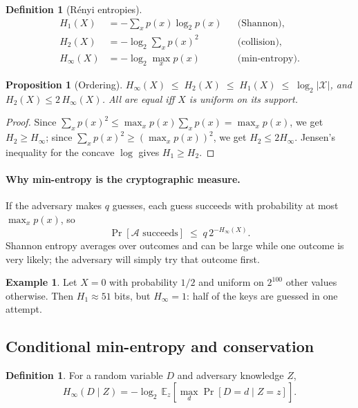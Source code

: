 \documentclass[11pt,a4paper]{article}
\theoremstyle{plain}
\newtheorem{proposition}[theorem]{Proposition}
\theoremstyle{definition}
\newtheorem{definition}[theorem]{Definition}
\newtheorem{example}[theorem]{Example}
\newcommand{\Hmin}{H_\infty}
\begin{document}
\begin{definition}[R\'enyi entropies]
\begin{align}
    H_1(X) &= -\sum_x p(x)\log_2 p(x) &&\text{(Shannon)},\label{eq:shannon}\\
    H_2(X) &= -\log_2 \sum_x p(x)^2 &&\text{(collision)},\label{eq:collision}\\
    \Hmin(X) &= -\log_2 \max_x p(x) &&\text{(min-entropy)}.\label{eq:minentropy}
\end{align}
\end{definition}

\begin{proposition}[Ordering]\label{prop:order}
$\Hmin(X)\;\le\;H_2(X)\;\le\;H_1(X)\;\le\;\log_2|\mathcal{X}|$, and
$H_2(X)\le 2\,\Hmin(X)$. All are equal iff $X$ is uniform on its support.
\end{proposition}

\begin{proof}
Since $\sum_x p(x)^2 \le \max_x p(x)\sum_x p(x)=\max_x p(x)$, we get
$H_2\ge\Hmin$; since $\sum_x p(x)^2\ge(\max_x p(x))^2$, we get $H_2\le 2\Hmin$.
Jensen's inequality for the concave $\log$ gives $H_1\ge H_2$.
\end{proof}

\paragraph{Why min-entropy is the cryptographic measure.} If the adversary makes
$q$ guesses, each guess succeeds with probability at most $\max_x p(x)$, so
\begin{equation}
    \Pr[\mathcal{A}\text{ succeeds}] \;\le\; q\,2^{-\Hmin(X)}.
\end{equation}
Shannon entropy averages over outcomes and can be large while one outcome is
very likely; the adversary will simply try that outcome first.
\begin{example}
Let $X=0$ with probability $1/2$ and uniform on $2^{100}$ other values
otherwise. Then $H_1\approx 51$ bits, but $\Hmin=1$: half of the keys are
guessed in one attempt.
\end{example}

\subsection{Conditional min-entropy and conservation}\label{sec:conservation}

\begin{definition}
For a random variable $D$ and adversary knowledge $Z$,
\begin{equation}
\Hmin(D\mid Z)=-\log_2\,\mathbb{E}_z\!\left[\max_d \Pr[D=d\mid Z=z]\right].
\end{equation}
\end{definition}
\end{document}
